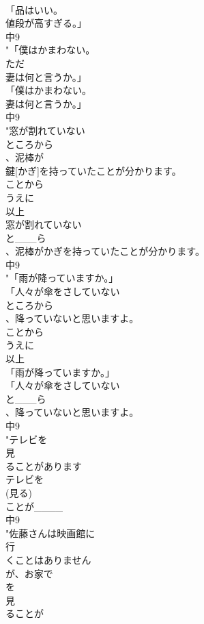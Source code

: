 \documentclass[8pt]{extreport}
\begin{document}
\begin{CJK}{UTF8}{min}
\\	「品はいい。
\\	値段が高すぎる。」
\\	中9
\\	"「僕はかまわない。
\\	ただ
\\	妻は何と言うか。」
\\	「僕はかまわない。
\\	妻は何と言うか。」
\\	中9
\\	"窓が割れていない
\\	ところから
\\	、泥棒が
\\	鍵[かぎ]を持っていたことが分かります。
\\	ことから
\\	うえに
\\	以上
\\	窓が割れていない
\\	と___ら
\\	、泥棒がかぎを持っていたことが分かります。
\\	中9
\\	"「雨が降っていますか。」
\\	「人々が傘をさしていない
\\	ところから
\\	、降っていないと思いますよ。
\\	ことから
\\	うえに
\\	以上
\\	「雨が降っていますか。」
\\	「人々が傘をさしていない
\\	と___ら
\\	、降っていないと思いますよ。
\\	中9
\\	"テレビを
\\	見
\\	ることがあります
\\	テレビを
\\	(見る)
\\	ことが____
\\	中9
\\	"佐藤さんは映画館に
\\	行
\\	くことはありません
\\	が、お家で
\\	を
\\	見
\\	ることが

\end{CJK}
\end{document}
